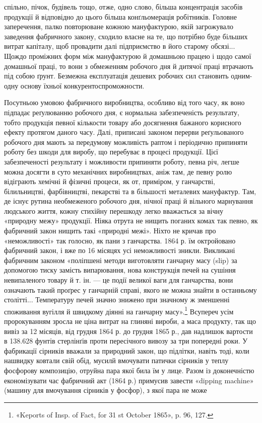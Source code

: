 спільно, пічок, будівель тощо, отже, одно слово, більша концентрація
засобів продукції й відповідно до цього більша конґльомерація
робітників. Головне заперечення, палко повторюване
кожною мануфактурою, якій загрожувало заведення фабричного
закону, сходило власне на те, що потрібно буде більших витрат
капіталу, щоб провадити далі підприємство в його старому обсязі...
Щождо проміжних форм між мануфактурою й домашньою працею
і щодо самої домашньої праці, то вони з обмеженням робочого
дня й дитячої праці втрачають під собою ґрунт. Безмежна експлуатація
дешевих робочих сил становить одним-одну основу їхньої
конкурентоспроможности.

Посутньою умовою фабричного виробництва, особливо від того
часу, як воно підпадає реґулюванню робочого дня, є нормальна
забезпеченість результату, тобто продукція певної кількости товару
або досягнення бажаного корисного ефекту протягом даного
часу. Далі, приписані законом перерви реґульованого робочого
дня мають за передумову можливість раптом і періодично припиняти
роботу без шкоди для виробу, що перебуває в процесі продукції.
Цієї забезпеченості результату і можливости припиняти
роботу, певна річ, легше можна досягти в суто механічних виробництвах,
аніж там, де певну ролю відіграють хемічні й фізичні
процеси, як от, приміром, у ганчарстві, білильництві, фарбівництві,
пекарстві та в більшості металевих мануфактур. Там, де
існує рутина необмеженого робочого дня, нічної праці й вільного
марнування людського життя, кожну стихійну перешкоду легко
вважається за вічну «природну межу» продукції. Ніяка отрута
не нищить поганих комах так певно, як фабричний закон нищить
такі «природні межі». Ніхто не кричав про «неможливості» так
голосно, як пани з ганчарства. 1864 р. їм октройовано фабричний
закон, і вже по 16 місяцях усі неможливості зникли. Викликані
фабричним законом «поліпшені методи виготовляти ганчарну
масу (slip) за допомогою тиску замість випарювання, нова конструкція
печей на сушіння невипаленого товару й т. ін. — це
події великої ваги для ганчарства, вони означають такий проґрес
у ганчарній справі, якого не можна знайти в останньому столітті...
Температуру печей значно знижено при значному ж зменшенні
споживання вугілля й швидкому діянні на ганчарну масу».\footnote{
«Keports of Insp. of Fact, for 31 st October 1865», p. 96, 127.
}
Всупереч усім пророкуванням зросла не ціна витрат на глиняні
вироби, а маса продукту, так що вивіз за 12 місяців, від грудня
1864 р. до грудня 1865 р., дав надлишок вартости в 138.628 фунтів
стерлінґів проти пересічного вивозу за три попередні роки. У фабрикації
сірників вважали за природний закон, що підлітки,
навіть тоді, коли нашвидку ковтали свій обід, мусилй вмочувати
патички сірників у теплу фосфорову композицію, отруйна пара
якої била їм у лице. Разом із доконечністю економізувати час
фабричний акт (1864 р.) примусив завести «dipping machine»
(машину для вмочування сірників у фосфор), з якої пара не може